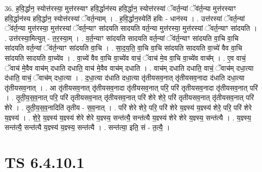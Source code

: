 \documentclass[17pt]{extarticle}
\begin{document}
36. ह॒वि॒र्द्धान॒ स्योत्त॑रस्या॒ मुत्त॑रस्याꣳ हवि॒र्द्धान॑स्य हवि॒र्द्धान॒ स्योत्त॑रस्यां ॅवर्त॒न्यां ॅव॑र्त॒न्या मुत्त॑रस्याꣳ हवि॒र्द्धान॑स्य हवि॒र्द्धान॒ स्योत्त॑रस्यां ॅवर्त॒न्याम् । . ह॒वि॒र्द्धान॒स्येति॑ हविः - धान॑स्य । . उत्त॑रस्यां ॅवर्त॒न्यां ॅव॑र्त॒न्या मुत्त॑रस्या॒ मुत्त॑रस्यां ॅवर्त॒न्याꣳ सा॑दयति सादयति वर्त॒न्या मुत्त॑रस्या॒ मुत्त॑रस्यां ॅवर्त॒न्याꣳ सा॑दयति । . उत्त॑रस्या॒मित्युत् - त॒र॒स्या॒म् । . व॒र्त॒न्याꣳ सा॑दयति सादयति वर्त॒न्यां ॅव॑र्त॒न्याꣳ सा॑दयति वा॒चि वा॒चि सा॑दयति वर्त॒न्यां ॅव॑र्त॒न्याꣳ सा॑दयति वा॒चि । . सा॒द॒य॒ति॒ वा॒चि वा॒चि सा॑दयति सादयति वा॒च्ये॑ वैव वा॒चि सा॑दयति सादयति वा॒च्ये॑व । . वा॒च्ये॑ वैव वा॒चि वा॒च्ये॑व वाचं॒ ॅवाच॑ मे॒व वा॒चि वा॒च्ये॑व वाच᳚म् । . ए॒व वाचं॒ ॅवाच॑ मे॒वैव वाच॑म् दधाति दधाति॒ वाच॑ मे॒वैव वाच॑म् दधाति । . वाच॑म् दधाति दधाति॒ वाचं॒ ॅवाच॑म् दधा॒त्या द॑धाति॒ वाचं॒ ॅवाच॑म् दधा॒त्या । . द॒धा॒त्या द॑धाति दधा॒त्या तृ॑तीयसव॒नात् तृ॑तीयसव॒नादा द॑धाति दधा॒त्या तृ॑तीयसव॒नात् । . आ तृ॑तीयसव॒नात् तृ॑तीयसव॒नादा तृ॑तीयसव॒नात् परि॒ परि॑ तृतीयसव॒नादा तृ॑तीयसव॒नात् परि॑ । . तृ॒ती॒य॒स॒व॒नात् परि॒ परि॑ तृतीयसव॒नात् तृ॑तीयसव॒नात् परि॑ शेरे शेरे॒ परि॑ तृतीयसव॒नात् तृ॑तीयसव॒नात् परि॑ शेरे । . तृ॒ती॒य॒स॒व॒नादिति॑ तृतीय - स॒व॒नात् । . परि॑ शेरे शेरे॒ परि॒ परि॑ शेरे य॒ज्ञ्स्य॑ य॒ज्ञ्स्य॑ शेरे॒ परि॒ परि॑ शेरे य॒ज्ञ्स्य॑ । . शे॒रे॒ य॒ज्ञ्स्य॑ य॒ज्ञ्स्य॑ शेरे शेरे य॒ज्ञ्स्य॒ सन्त॑त्यै॒ सन्त॑त्यै य॒ज्ञ्स्य॑ शेरे शेरे य॒ज्ञ्स्य॒ सन्त॑त्यै । . य॒ज्ञ्स्य॒ सन्त॑त्यै॒ सन्त॑त्यै य॒ज्ञ्स्य॑ य॒ज्ञ्स्य॒ सन्त॑त्यै । . सन्त॑त्या॒ इति॒ सं - त॒त्यै॒ । \newline
\pagebreak
{}

\section{ TS 6.4.10.1 }
\end{document}
